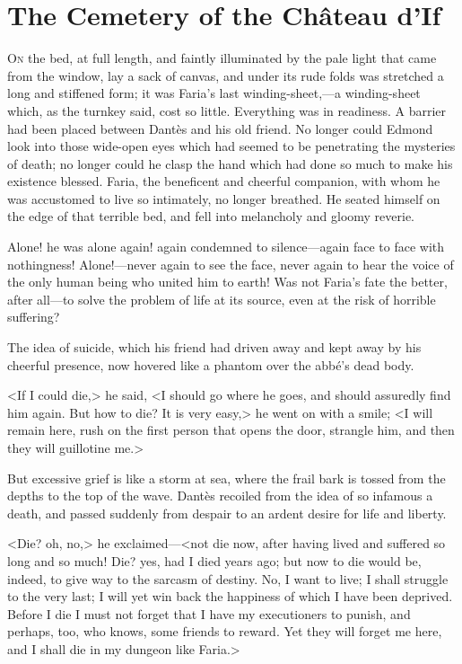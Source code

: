 \chapter{The Cemetery of the Château d'If}

 \lettrine{O}{n} the bed, at full length, and faintly illuminated by the pale light that came from the window, lay a sack of canvas, and under its rude folds was stretched a long and stiffened form; it was Faria's last winding-sheet,—a winding-sheet which, as the turnkey said, cost so little. Everything was in readiness. A barrier had been placed between Dantès and his old friend. No longer could Edmond look into those wide-open eyes which had seemed to be penetrating the mysteries of death; no longer could he clasp the hand which had done so much to make his existence blessed. Faria, the beneficent and cheerful companion, with whom he was accustomed to live so intimately, no longer breathed. He seated himself on the edge of that terrible bed, and fell into melancholy and gloomy reverie. 

 Alone! he was alone again! again condemned to silence—again face to face with nothingness! Alone!—never again to see the face, never again to hear the voice of the only human being who united him to earth! Was not Faria's fate the better, after all—to solve the problem of life at its source, even at the risk of horrible suffering? 

 The idea of suicide, which his friend had driven away and kept away by his cheerful presence, now hovered like a phantom over the abbé's dead body. 

 <If I could die,> he said, <I should go where he goes, and should assuredly find him again. But how to die? It is very easy,> he went on with a smile; <I will remain here, rush on the first person that opens the door, strangle him, and then they will guillotine me.> 

 But excessive grief is like a storm at sea, where the frail bark is tossed from the depths to the top of the wave. Dantès recoiled from the idea of so infamous a death, and passed suddenly from despair to an ardent desire for life and liberty. 

 <Die? oh, no,> he exclaimed—<not die now, after having lived and suffered so long and so much! Die? yes, had I died years ago; but now to die would be, indeed, to give way to the sarcasm of destiny. No, I want to live; I shall struggle to the very last; I will yet win back the happiness of which I have been deprived. Before I die I must not forget that I have my executioners to punish, and perhaps, too, who knows, some friends to reward. Yet they will forget me here, and I shall die in my dungeon like Faria.> 

